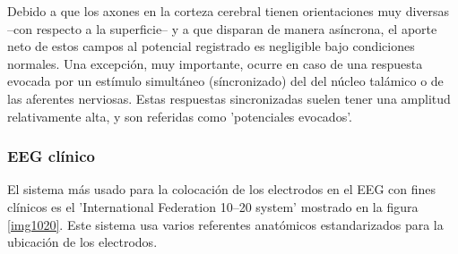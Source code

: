 


Debido a que los axones en la corteza cerebral tienen orientaciones muy diversas --con
respecto a la superficie-- y a que disparan de manera as\'incrona, el aporte neto de estos campos
al potencial registrado es negligible bajo condiciones normales.
Una excepci\'on, muy importante, ocurre en caso de una respuesta evocada por un est\'imulo
simult\'aneo (s\'incronizado) del del n\'ucleo 
tal\'amico o de las aferentes nerviosas.
Estas respuestas sincronizadas suelen tener una amplitud relativamente alta, y
son referidas como 'potenciales evocados'.


\subsubsection{EEG cl\'inico}

El sistema m\'as usado para la colocaci\'on de los electrodos en el EEG con fines cl\'inicos es el 
'International Federation 10--20 system' \cite{Jasper58,AASM07} mostrado en la figura \ref{img1020}. 
Este sistema usa varios
referentes anat\'omicos estandarizados para la ubicaci\'on de los electrodos.


